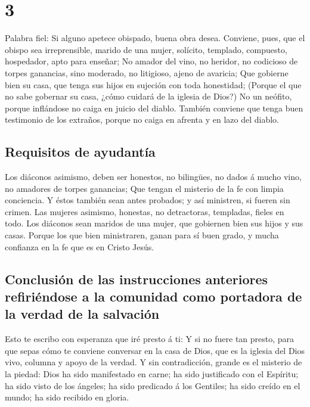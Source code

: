 \hypertarget{section-2}{%
\section{3}\label{section-2}}

 Palabra fiel: Si alguno apetece obispado, buena obra desea.
 Conviene, pues, que el obispo sea irreprensible, marido de
una mujer, solícito, templado, compuesto, hospedador, apto para enseñar;
 No amador del vino, no heridor, no codicioso de torpes
ganancias, sino moderado, no litigioso, ajeno de avaricia; 
Que gobierne bien su casa, que tenga sus hijos en sujeción con toda
honestidad;  (Porque el que no sabe gobernar su casa, ¿cómo
cuidará de la iglesia de Dios?)  No un neófito, porque
inflándose no caiga en juicio del diablo.  También conviene
que tenga buen testimonio de los extraños, porque no caiga en afrenta y
en lazo del diablo.

\hypertarget{requisitos-de-ayudantuxeda}{%
\subsection{Requisitos de ayudantía}\label{requisitos-de-ayudantuxeda}}

 Los diáconos asimismo, deben ser honestos, no bilingües, no
dados á mucho vino, no amadores de torpes ganancias;  Que
tengan el misterio de la fe con limpia conciencia.  Y éstos
también sean antes probados; y así ministren, si fueren sin crimen.
 Las mujeres asimismo, honestas, no detractoras, templadas,
fieles en todo.  Los diáconos sean maridos de una mujer,
que gobiernen bien sus hijos y sus casas.  Porque los que
bien ministraren, ganan para sí buen grado, y mucha confianza en la fe
que es en Cristo Jesús.

\hypertarget{conclusiuxf3n-de-las-instrucciones-anteriores-refiriuxe9ndose-a-la-comunidad-como-portadora-de-la-verdad-de-la-salvaciuxf3n}{%
\subsection{Conclusión de las instrucciones anteriores refiriéndose a la
comunidad como portadora de la verdad de la
salvación}\label{conclusiuxf3n-de-las-instrucciones-anteriores-refiriuxe9ndose-a-la-comunidad-como-portadora-de-la-verdad-de-la-salvaciuxf3n}}

 Esto te escribo con esperanza que iré presto á ti:
 Y si no fuere tan presto, para que sepas cómo te conviene
conversar en la casa de Dios, que es la iglesia del Dios vivo, columna y
apoyo de la verdad.  Y sin contradicción, grande es el
misterio de la piedad: Dios ha sido manifestado en carne; ha sido
justificado con el Espíritu; ha sido visto de los ángeles; ha sido
predicado á los Gentiles; ha sido creído en el mundo; ha sido recibido
en gloria.

